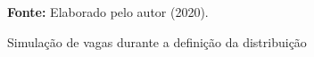 \begin{figure}[ht!]
\centering

\caption{\textmd{Simulação de vagas durante a definição da distribuição}}
\label{fig:simulacaovagas}

\par\medskip\textbf{Fonte:} Elaborado pelo autor (2020). \par\medskip

\end{figure}


